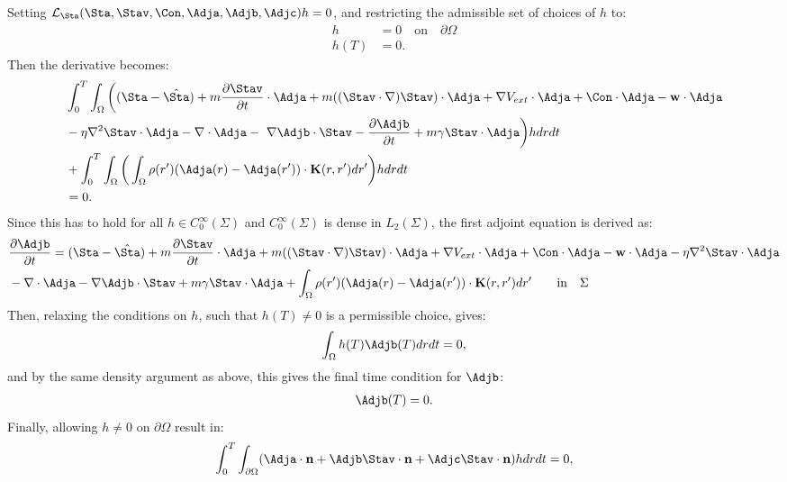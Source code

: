 Setting $\mathcal{L}_\Sta(\Sta,\Stav,\Con,\Adja,\Adjb,\Adjc)h=0$, and restricting the admissible set of choices of $h$ to:
\begin{align*}
h&=0 \quad \text{on} \quad \partial \Omega\\
h(T)&=0.
\end{align*}
Then the derivative becomes:
\begin{align*}
 &\int_0^T \int_\Omega \bigg( (\Sta - \hat \Sta) +m  \frac{\partial \Stav}{\partial t}\cdot \Adja + m  ((\Stav \cdot \nabla)\Stav )\cdot \Adja+ \nabla V_{ext}\cdot \Adja + \Con \cdot \Adja - \mathbf{w} \cdot \Adja \\
 &- \eta \nabla^2 \Stav \cdot \Adja  -\nabla\cdot \Adja  - \ \nabla \Adjb \cdot \Stav  -  \frac{\partial \Adjb}{\partial t} +m \gamma \Stav \cdot \Adja \bigg) h dr dt \\
 &+ \int_0^T \int_\Omega \bigg(  \int_\Omega  \rho(r')(\Adja(r) - \Adja(r')) \cdot \mathbf{K}(r,r')   dr'  \bigg)hdr dt\\
 &=0.
\end{align*}
Since this has to hold for all $h \in C_0^\infty(\Sigma)$ and $C_0^\infty(\Sigma)$ is dense in $L_2(\Sigma)$, the first adjoint equation is derived as:
\begin{align}
& \frac{\partial \Adjb}{\partial t} = (\Sta - \hat \Sta) +m  \frac{\partial \Stav}{\partial t}\cdot \Adja + m ( (\Stav \cdot \nabla)\Stav) \cdot \Adja+ \nabla V_{ext}\cdot \Adja + \Con \cdot \Adja - \mathbf{w} \cdot \Adja  - \eta \nabla^2 \Stav \cdot \Adja \\
&-\nabla\cdot \Adja  -  \nabla \Adjb \cdot \Stav + m \gamma \Stav \cdot \Adja + \int_\Omega  \rho(r')( \Adja(r) - \Adja(r') ) \cdot\mathbf{K}(r,r')   dr' \qquad \text{in} \quad \Sigma \notag
\end{align}
Then, relaxing the conditions on $h$, such that $h(T) \neq 0$ is a permissible choice, gives:
\begin{align*}
\int_\Omega h(T) \Adjb(T) dr dt=0,
\end{align*}
and by the same density argument as above, this gives the final time condition for $\Adjb$:
\begin{align*}
\Adjb(T) = {0} .
\end{align*}
Finally, allowing $h \neq 0$ on $\partial\Omega$ result in:
\begin{align*}
\int_0^T \int_{\partial \Omega} ( \Adja \cdot \mathbf{n}  +  \Adjb \Stav \cdot \mathbf{n}   +\Adjc \Stav \cdot \mathbf{n})h  dr dt=0,
\end{align*}
